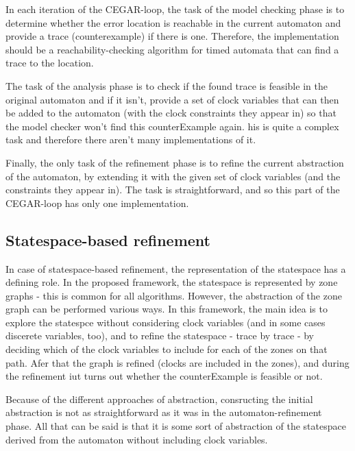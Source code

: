 In each iteration of the CEGAR-loop, the task of the model checking phase is to determine whether the error location is reachable in the current automaton and provide a trace (counterexample) if there is one. Therefore, the implementation should be a reachability-checking algorithm for timed automata that can find a trace to the location.

The task of the analysis phase is to check if the found trace is feasible in the original automaton and if it isn't, provide a set of clock variables that can then be added to the automaton (with the clock constraints they appear in) so that the model checker won't find this counterExample again. his is quite a complex task and therefore there aren't many implementations of it.

Finally, the only task of the refinement phase is to refine the current abstraction of the automaton, by extending it with the given set of clock variables (and the constraints they appear in). The task is straightforward, and so this part of the CEGAR-loop has only one implementation.



\subsection{Statespace-based refinement}

In case of statespace-based refinement, the representation of the statespace has a defining role. In the proposed framework, the statespace is represented by zone graphs - this is common for all algorithms. However, the abstraction of the zone graph can be performed various ways. In this framework, the main idea is to explore the statespce without considering clock variables (and in some cases discerete variables, too), and to refine the statespace - trace by trace - by deciding which of the clock variables to include for each of the zones on that path. Afer that the graph is refined (clocks are included in the zones), and during the refinement iut turns out whether the counterExample is feasible or not.  

Because of the different approaches of abstraction, consructing the initial abstraction is not as straightforward as it was in the automaton-refinement phase. All that can be said is that it is some sort of abstraction of the statespace derived from the automaton without including clock variables.

